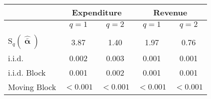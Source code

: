 \begin{tabular}{@{}lcccc@{}}
	\toprule 
	& \multicolumn{2}{c}{ Expenditure } & \multicolumn{2}{c}{ Revenue } \\
	\hline
	& $q=1$ & $q=2$ & $q=1$ & $q=2$ \\
	\hline \\
	$\text{S}_q (\boldsymbol{\hat{\bar{\upalpha}}})$ & 3.87 & 1.40 & 1.97 & 0.76\vspace{2mm}\\
	i.i.d. & 0.002 & 0.003 & 0.001 & 0.001\\
	i.i.d. Block & 0.001 & 0.002 & 0.001 & 0.001\\
	Moving Block & $<0.001$ & $<0.001$ & $<0.001$ & $<0.001$ \\
	\bottomrule
\end{tabular}
